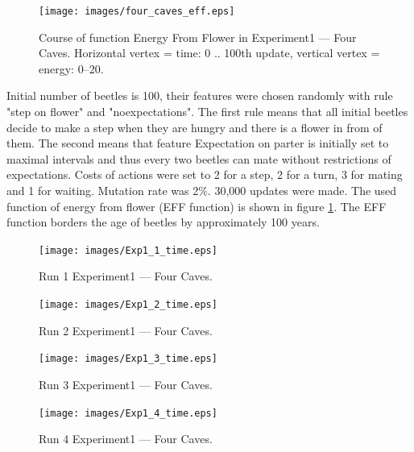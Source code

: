 \documentclass[a4paper,12pt]{report}
\begin{document}
\begin{figure}
\begin{center}
  \texttt{[image: images/four\_caves\_eff.eps]}
  \caption{Course of function Energy From Flower in Experiment1 --- Four Caves. Horizontal vertex = time: 0 .. 100th update, vertical vertex = energy: 0--20.}
  \label{img.four_caves_eff}
\end{center}
\end{figure}

Initial number of beetles is 100, their features were chosen randomly with rule "step on flower" and "noexpectations". The first rule means that all initial beetles decide to make a step when they are hungry and there is a flower in from of them. The second means that feature Expectation on parter is initially set to maximal intervals and thus every two beetles can mate without restrictions of expectations. Costs of actions were set to 2 for a step, 2 for a turn, 3 for mating and 1 for waiting. Mutation rate was 2\%. 30,000 updates were made. The used function of energy from flower (EFF function) is shown in figure \ref{img.four_caves_eff}. The EFF function borders the age of beetles by approximately 100 years.



\begin{figure}
\begin{center}
  \texttt{[image: images/Exp1\_1\_time.eps]}
  \caption{Run 1 Experiment1 --- Four Caves.}
  \label{img.four_caves_run1_time}
\end{center}
\end{figure}

\begin{figure}
\begin{center}
  \texttt{[image: images/Exp1\_2\_time.eps]}
  \caption{Run 2 Experiment1 --- Four Caves.}
  \label{img.four_caves_run2_time}
\end{center}
\end{figure}

\begin{figure}
\begin{center}
  \texttt{[image: images/Exp1\_3\_time.eps]}
  \caption{Run 3 Experiment1 --- Four Caves.}
  \label{img.four_caves_run3_time}
\end{center}
\end{figure}

\begin{figure}
\begin{center}
  \texttt{[image: images/Exp1\_4\_time.eps]}
  \caption{Run 4 Experiment1 --- Four Caves.}
  \label{img.four_caves_run4_time}
\end{center}
\end{figure}
\end{document}
